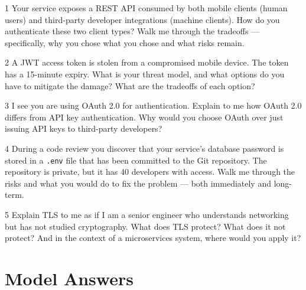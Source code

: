 \documentclass[11pt,a4paper]{article}
\begin{document}
\vspace{0.5cm}

\begin{quizbox}{1}
Your service exposes a REST API consumed by both mobile clients (human users) and third-party developer integrations (machine clients). How do you authenticate these two client types? Walk me through the tradeoffs --- specifically, why you chose what you chose and what risks remain.
\end{quizbox}

\vspace{0.4cm}

\begin{quizbox}{2}
A JWT access token is stolen from a compromised mobile device. The token has a 15-minute expiry. What is your threat model, and what options do you have to mitigate the damage? What are the tradeoffs of each option?
\end{quizbox}

\vspace{0.4cm}

\begin{quizbox}{3}
I see you are using OAuth 2.0 for authentication. Explain to me how OAuth 2.0 differs from API key authentication. Why would you choose OAuth over just issuing API keys to third-party developers?
\end{quizbox}

\vspace{0.4cm}

\begin{quizbox}{4}
During a code review you discover that your service's database password is stored in a \texttt{.env} file that has been committed to the Git repository. The repository is private, but it has 40 developers with access. Walk me through the risks and what you would do to fix the problem --- both immediately and long-term.
\end{quizbox}

\vspace{0.4cm}

\begin{quizbox}{5}
Explain TLS to me as if I am a senior engineer who understands networking but has not studied cryptography. What does TLS protect? What does it not protect? And in the context of a microservices system, where would you apply it?
\end{quizbox}

\newpage
\section*{Model Answers}
\end{document}
